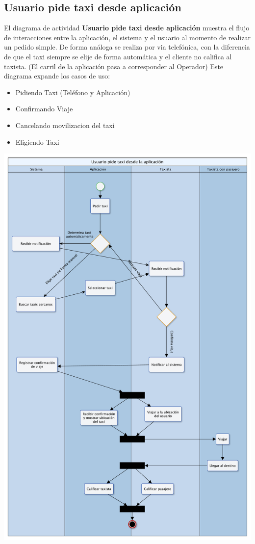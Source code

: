 \documentclass[a4paper]{article}
\begin{document}
\subsection{Usuario pide taxi desde aplicaci\'on}
El diagrama de actividad \textbf{Usuario pide taxi desde aplicaci\'on} muestra el flujo de interacciones entre la aplicaci\'on, el sistema y el usuario 
al momento de realizar un pedido simple. De forma an\'aloga se realiza por via telef\'onica, con la diferencia de que el taxi siempre se elije de forma autom\'atica y el cliente no califica al taxista. (El carril de la aplicaci\'on pasa a corresponder al Operador)
Este diagrama expande los casos de uso:
\begin{itemize}
\item Pidiendo Taxi (Tel\'efono y Aplicaci\'on)
\item Confirmando Viaje
\item Cancelando movilizacion del taxi
\item Eligiendo Taxi
\end{itemize}


\begin{center}
\includegraphics[scale=0.5]{DA_Pide_Taxi.pdf}
\end{center}
\end{document}
